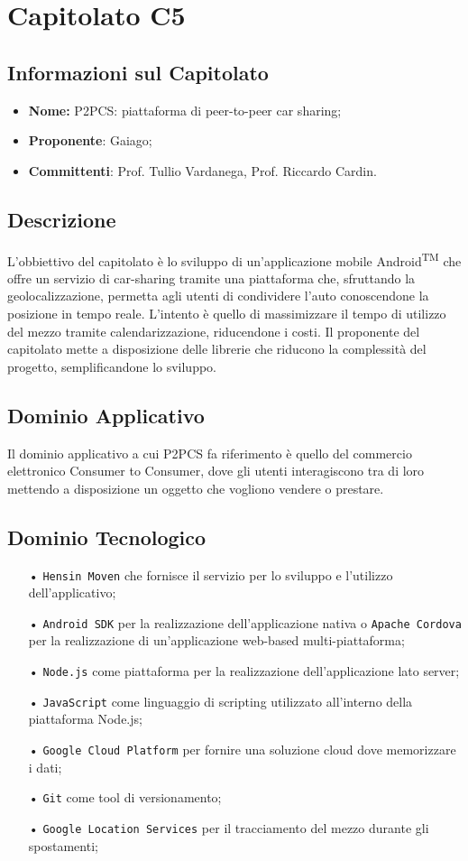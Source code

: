 \section{Capitolato C5}
\subsection{Informazioni sul Capitolato}
\begin{itemize}
	\item \textbf{Nome:} P2PCS: piattaforma di peer-to-peer car sharing;
	\item \textbf{Proponente}: Gaiago;
	\item \textbf{Committenti}: Prof. Tullio Vardanega, Prof. Riccardo Cardin.
\end{itemize}
\subsection{Descrizione}
L'obbiettivo del capitolato è lo sviluppo di un'applicazione mobile Android\textsuperscript{TM} che offre un servizio di 
car-sharing tramite una piattaforma che, sfruttando la geolocalizzazione, permetta agli utenti di condividere l'auto conoscendone la posizione in tempo reale. 
L'intento è quello di massimizzare il tempo di utilizzo del mezzo tramite calendarizzazione, 
riducendone i costi. 
Il proponente del capitolato mette a disposizione delle librerie che riducono la 
complessità del progetto, semplificandone lo sviluppo.

\subsection{Dominio Applicativo}
Il dominio applicativo a cui P2PCS fa riferimento è quello del commercio elettronico Consumer to Consumer, dove gli utenti interagiscono tra di loro mettendo a disposizione un oggetto che vogliono vendere o prestare.

\subsection{Dominio Tecnologico}
\begin{itemize}
\item[•] \texttt{Hensin Moven} che fornisce il servizio per lo sviluppo e l'utilizzo dell'applicativo;
\item[•] \texttt{Android SDK} per la realizzazione dell'applicazione nativa o \texttt{Apache Cordova} per
 la realizzazione di un'applicazione web-based multi-piattaforma;
\item[•] \texttt{Node.js} come piattaforma per la realizzazione dell'applicazione lato server;
\item[•] \texttt{JavaScript} come linguaggio di scripting utilizzato all'interno della piattaforma Node.js;
\item[•] \texttt{Google Cloud Platform} per fornire una soluzione cloud dove memorizzare i dati;
\item[•] \texttt{Git} come tool di versionamento;
\item[•] \texttt{Google Location Services} per il tracciamento del mezzo durante gli spostamenti;
\end{itemize}

